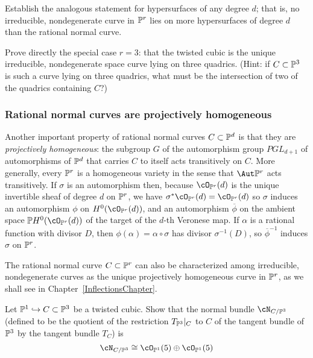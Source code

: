 \begin{exercise}
Establish the analogous statement for hypersurfaces of any degree $d$; that is, no irreducible, nondegenerate curve in $\PP^r$ lies on more hypersurfaces of degree $d$ than the rational normal curve.
\end{exercise}

\begin{exercise}
Prove directly  the special case $r=3$: that the twisted cubic is the unique irreducible, nondegenerate space curve lying on three quadrics. (Hint: if $C \subset \PP^3$ is such a curve lying on three quadrics, what must be the intersection of two of the quadrics containing $C$?)
\end{exercise}

\subsubsection{Rational normal curves are projectively homogeneous}

Another important property of rational normal curves $C \subset \PP^d$ is that they are \emph{projectively homogeneous}: the subgroup $G$ of the automorphism group $PGL_{d+1}$ of automorphisms of $\PP^d$ that carries $C$ to itself acts transitively on $C$. More generally,
every $\PP^r$ is a homogeneous variety in the sense that $\Aut \PP^r$ acts transitively. If $\sigma$ is an automorphism then,
 because $\cO_{\PP^r}(d)$ is the unique
invertible sheaf of degree $d$ on $\PP^r$,  we have $\sigma^*\cO_{\PP^r}(d) = \cO_{\PP^r}(d)$ so $\sigma$ induces an automorphism $\phi$ on $H^0(\cO_{\PP^r}(d))$, and an automorphism $\overline \phi$ on the ambient space $\PP H^0(\cO_{\PP^r}(d))$ of the target of the $d$-th Veronese map. If $\alpha$
is a rational function with divisor $D$, then $\phi(\alpha) = \alpha\circ \sigma$ has divisor $\sigma^{-1}(D)$, so $\overline\phi^{-1}$ induces $\sigma$ on $\PP^r$. 

The rational normal curve $C \subset \PP^r$ can also be characterized among irreducible, nondegenerate curves as the unique projectively homogeneous curve in $\PP^r$, as we shall see in Chapter~\ref{InflectionsChapter}.

\begin{exercise}
Let $\PP^1 \hookrightarrow C \subset \PP^3$ be a twisted cubic. Show that the normal bundle $\cN_{C/\PP^3}$ (defined to be the quotient of the restriction $T_{\PP^3}|_C$ to $C$ of the tangent bundle  of $\PP^3$  by the tangent bundle $T_C$) is 
$$
\cN_{C/\PP^3} \cong \cO_{\PP^1}(5) \oplus  \cO_{\PP^1}(5)
$$
\end{exercise}

